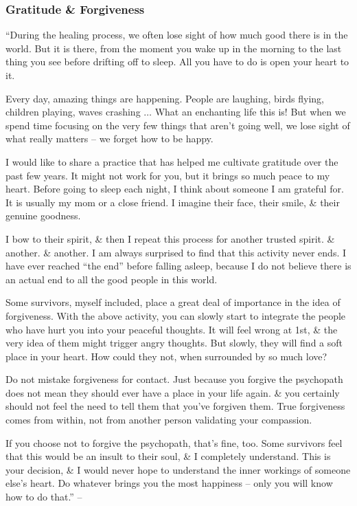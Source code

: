 \documentclass{article}
\numberwithin{equation}{section}
\begin{document}
\subsubsection{Gratitude \& Forgiveness}
``During the healing process, we often lose sight of how much good there is in the world. But it is there, from the moment you wake up in the morning to the last thing you see before drifting off to sleep. All you have to do is open your heart to it.

Every day, amazing things are happening. People are laughing, birds flying, children playing, waves crashing $\ldots$ What an enchanting life this is! But when we spend time focusing on the very few things that aren't going well, we lose sight of what really matters -- we forget how to be happy.

I would like to share a practice that has helped me cultivate gratitude over the past few years. It might not work for you, but it brings so much peace to my heart. Before going to sleep each night, I think about someone I am grateful for. It is usually my mom or a close friend. I imagine their face, their smile, \& their genuine goodness.

I bow to their spirit, \& then I repeat this process for another trusted spirit. \& another. \& another. I am always surprised to find that this activity never ends. I have ever reached ``the end'' before falling asleep, because I do not believe there is an actual end to all the good people in this world.

Some survivors, myself included, place a great deal of importance in the idea of forgiveness. With the above activity, you can slowly start to integrate the people who have hurt you into your peaceful thoughts. It will feel wrong at 1st, \& the very idea of them might trigger angry thoughts. But slowly, they will find a soft place in your heart. How could they not, when surrounded by so much love?

Do not mistake forgiveness for contact. Just because you forgive the psychopath does not mean they should ever have a place in your life again. \& you certainly should not feel the need to tell them that you've forgiven them. True forgiveness comes from within, not from another person validating your compassion.

If you choose not to forgive the psychopath, that's fine, too. Some survivors feel that this would be an insult to their soul, \& I completely understand. This is your decision, \& I would never hope to understand the inner workings of someone else's heart. Do whatever brings you the most happiness -- only you will know how to do that.'' -- \cite[pp. 178--179]{MacKenzie2015}
\end{document}
